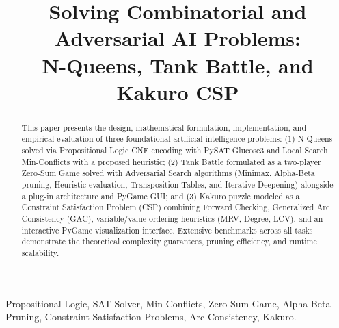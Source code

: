 \documentclass[conference]{IEEEtran}
\begin{document}
\title{Solving Combinatorial and Adversarial AI Problems:\\N-Queens, Tank Battle, and Kakuro CSP}

\author{
}

\maketitle

\begin{abstract}
This paper presents the design, mathematical formulation, implementation, and empirical evaluation of three foundational artificial intelligence problems: (1) N-Queens solved via Propositional Logic CNF encoding with PySAT Glucose3 and Local Search Min-Conflicts with a proposed heuristic; (2) Tank Battle formulated as a two-player Zero-Sum Game solved with Adversarial Search algorithms (Minimax, Alpha-Beta pruning, Heuristic evaluation, Transposition Tables, and Iterative Deepening) alongside a plug-in architecture and PyGame GUI; and (3) Kakuro puzzle modeled as a Constraint Satisfaction Problem (CSP) combining Forward Checking, Generalized Arc Consistency (GAC), variable/value ordering heuristics (MRV, Degree, LCV), and an interactive PyGame visualization interface. Extensive benchmarks across all tasks demonstrate the theoretical complexity guarantees, pruning efficiency, and runtime scalability.
\end{abstract}

\begin{IEEEkeywords}
Propositional Logic, SAT Solver, Min-Conflicts, Zero-Sum Game, Alpha-Beta Pruning, Constraint Satisfaction Problems, Arc Consistency, Kakuro.
\end{IEEEkeywords}
\end{document}

